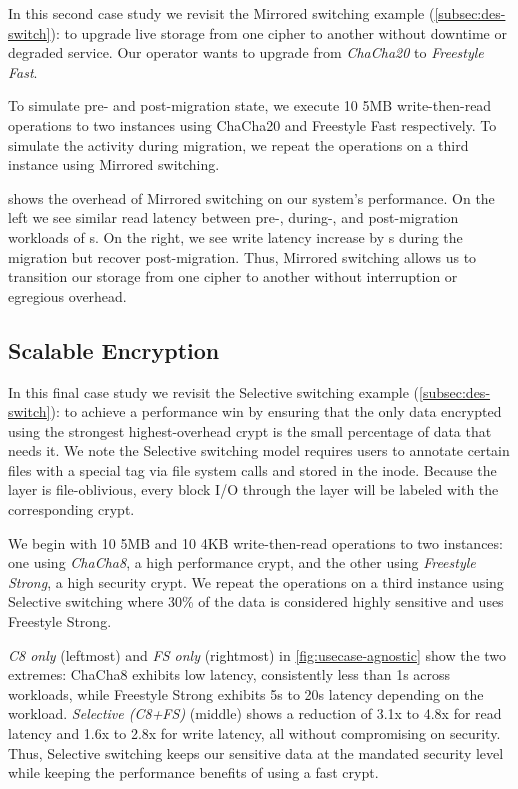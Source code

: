 In this second case study we revisit the Mirrored switching example
(\cref{subsec:des-switch}): to upgrade live storage from one cipher to another
without downtime or degraded service. Our operator wants to upgrade from {\em
ChaCha20} to {\em Freestyle Fast}.

To simulate pre- and post-migration state, we execute 10 5MB write-then-read
operations to two \sys instances using ChaCha20 and Freestyle Fast respectively.
To simulate the activity during migration, we repeat the operations on a third
instance using Mirrored switching.



 shows the overhead of Mirrored switching on our
system's performance. On the left we see similar read latency between pre-,
during-, and post-migration workloads of s. On the right, we see write
latency increase by s during the migration but recover post-migration.
Thus, Mirrored switching allows us to transition our storage from one cipher to
another without interruption or egregious overhead.


\subsection{Scalable Encryption}\label{subsec:usecase-agnostic}

In this final case study we revisit the Selective switching example
(\cref{subsec:des-switch}): to achieve a performance win by ensuring that the
only data encrypted using the strongest highest-overhead crypt is the small
percentage of data that needs it. We note the Selective switching model requires
users to annotate certain files with a special tag via file system calls and
stored in the inode. Because the \sys layer is file-oblivious, every block I/O
through the \sys layer will be labeled with the corresponding crypt.

We begin with 10 5MB and 10 4KB write-then-read operations to two \sys
instances: one using {\em ChaCha8}, a high performance crypt, and the other
using {\em Freestyle Strong}, a high security crypt. We repeat the operations on
a third instance using Selective switching where 30\% of the data is considered
highly sensitive and uses Freestyle Strong.



{\em C8 only} (leftmost) and {\em FS only} (rightmost) in
\cref{fig:usecase-agnostic} show the two extremes: ChaCha8 exhibits low latency,
consistently less than 1s across workloads, while Freestyle Strong exhibits 5s
to 20s latency depending on the workload. {\em Selective (C8+FS)} (middle) shows
a reduction of 3.1x to 4.8x for read latency and 1.6x to 2.8x for write latency,
all without compromising on security. Thus, Selective switching keeps our
sensitive data at the mandated security level while keeping the performance
benefits of using a fast crypt.
